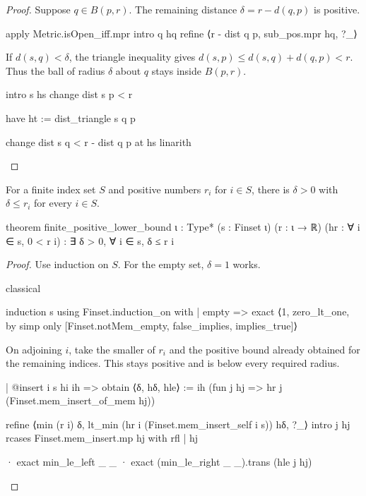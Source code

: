 \begin{proof}
  Suppose $q\in B(p,r)$.
  The remaining distance $\delta=r-d(q,p)$ is positive.

  \begin{lean}
    apply Metric.isOpen_iff.mpr
    intro q hq
    refine ⟨r - dist q p, sub_pos.mpr hq, ?_⟩
  \end{lean}

  If $d(s,q)<\delta$, the triangle inequality gives $d(s,p)\leq d(s,q)+d(q,p)<r$.
  Thus the ball of radius $\delta$ about $q$ stays inside $B(p,r)$.

  \begin{lean}
    intro s hs
    change dist s p < r

    have ht := dist_triangle s q p

    change dist s q < r - dist q p at hs
    linarith
  \end{lean}

\end{proof}

\begin{lemma}
  \label{ma:lem:finite-positive-lower-bound}
  For a finite index set $S$ and positive numbers $r_i$ for $i\in S$, there is $\delta>0$ with
  $\delta\leq r_i$ for every $i\in S$.

  \begin{lean}
    theorem finite_positive_lower_bound {ι : Type*} (s : Finset ι)
        (r : ι → ℝ) (hr : ∀ i ∈ s, 0 < r i) :
        ∃ δ > 0, ∀ i ∈ s, δ ≤ r i
  \end{lean}
\end{lemma}

\begin{proof}
  Use induction on $S$.
  For the empty set, $\delta=1$ works.

  \begin{lean}
    classical

    induction s using Finset.induction_on with
    | empty => exact ⟨1, zero_lt_one, by simp only [Finset.notMem_empty, false_implies, implies_true]⟩
  \end{lean}

  On adjoining $i$, take the smaller of $r_i$ and the positive bound already obtained for the
  remaining indices.
  This stays positive and is below every required radius.

  \begin{lean}
    | @insert i s hi ih =>
      obtain ⟨δ, hδ, hle⟩ := ih (fun j hj => hr j (Finset.mem_insert_of_mem hj))

      refine ⟨min (r i) δ, lt_min (hr i (Finset.mem_insert_self i s)) hδ, ?_⟩
      intro j hj
      rcases Finset.mem_insert.mp hj with rfl | hj

      · exact min_le_left _ _
      · exact (min_le_right _ _).trans (hle j hj)
  \end{lean}
\end{proof}

